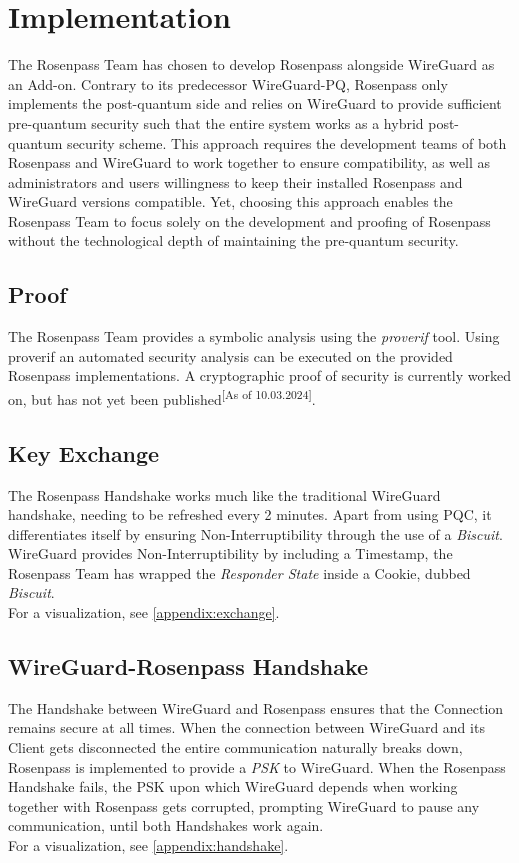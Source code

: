 \documentclass[sigconf]{acmart}
\begin{document}
\section{Implementation}
The Rosenpass Team has chosen to develop Rosenpass alongside WireGuard as an Add-on. Contrary to its predecessor WireGuard-PQ, Rosenpass only implements the post-quantum side and relies on WireGuard to provide sufficient pre-quantum security such that the entire system works as a hybrid post-quantum security scheme. This approach requires the development teams of both Rosenpass and WireGuard to work together to ensure compatibility, as well as administrators and users willingness to keep their installed Rosenpass and WireGuard versions compatible. Yet, choosing this approach enables the Rosenpass Team to focus solely on the development and proofing of Rosenpass without the technological depth of maintaining the pre-quantum security.

\subsection{Proof}
The Rosenpass Team provides a symbolic analysis using the \textit{proverif} tool. Using proverif an automated security analysis can be executed on the provided Rosenpass implementations. A cryptographic proof of security is currently worked on, but has not yet been published\cite{rosenpass}\textsuperscript{[As of 10.03.2024]}.


\subsection{Key Exchange}
The Rosenpass Handshake works much like the traditional WireGuard handshake, needing to be refreshed every 2 minutes. Apart from using PQC, it differentiates itself by ensuring Non-Interruptibility through the use of a \textit{Biscuit}. WireGuard provides Non-Interruptibility by including a Timestamp, the Rosenpass Team has wrapped the \textit{Responder State} inside a Cookie, dubbed \textit{Biscuit}\cite{rosenpass}. \\
For a visualization, see \ref{appendix:exchange}.

\subsection{WireGuard-Rosenpass Handshake}
The Handshake between WireGuard and Rosenpass ensures that the Connection remains secure at all times. When the connection between WireGuard and its Client gets disconnected the entire communication naturally breaks down, Rosenpass is implemented to provide a \textit{PSK} to WireGuard. When the Rosenpass Handshake fails, the PSK upon which WireGuard depends when working together with Rosenpass gets corrupted, prompting WireGuard to pause any communication, until both Handshakes work again\cite{rosenpass}.\\
For a visualization, see \ref{appendix:handshake}.
\end{document}
